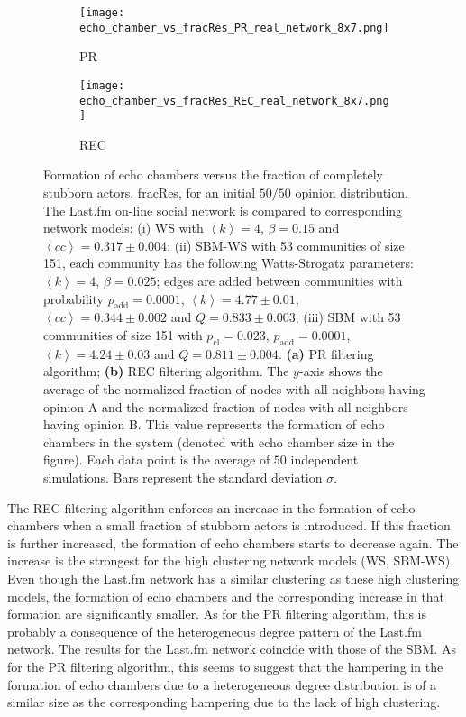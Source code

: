 \documentclass[11 pt , letterpaper , twoside , openright]{book}
\begin{document}
\begin{figure}[H]
  \begin{subfigure}[b]{0.49\textwidth}
    \caption{PR}
  	\texttt{[image: echo\_chamber\_vs\_fracRes\_PR\_real\_network\_8x7.png]}
    \label{pr_real}
  \end{subfigure}
  \begin{subfigure}[b]{0.49\textwidth}
    \caption{REC}
  	\texttt{[image: echo\_chamber\_vs\_fracRes\_REC\_real\_network\_8x7.png]}
    \label{rec_real}
  \end{subfigure}
  \captionsetup{format=plain}
  \caption[Formation of echo chambers versus fraction of completely stubborn actors for the PR and REC filtering algorithms and an initial $50/50$ opinion distribution. The Last.fm on-line social network is compared to corresponding network models.]{Formation of echo chambers versus the fraction of completely stubborn actors, fracRes, for an initial $50/50$ opinion distribution. The Last.fm on-line social network is compared to corresponding network models: (i) WS with $\left<k\right> = 4$, $\beta = 0.15$ and $\left<cc\right> = 0.317 \pm 0.004$; (ii) SBM-WS with 53 communities of size 151, each community has the following Watts-Strogatz parameters: $\left<k\right> = 4$, $\beta = 0.025$; edges are added between communities with probability $p_\text{add} = 0.0001$, $\left<k\right> = 4.77 \pm 0.01$, $\left<cc\right> = 0.344 \pm 0.002$ and $Q = 0.833 \pm 0.003$; (iii) SBM with 53 communities of size 151 with $p_\text{cl} = 0.023$, $p_\text{add} = 0.0001$, $\left<k\right> = 4.24 \pm 0.03$ and $Q = 0.811 \pm 0.004$. \textbf{(a)} PR filtering algorithm; \textbf{(b)} REC filtering algorithm. The $y$-axis shows the average of the normalized fraction of nodes with all neighbors having opinion A and the normalized fraction of nodes with all neighbors having opinion B. This value represents the formation of echo chambers in the system (denoted with echo chamber size in the figure). Each data point is the average of $50$ independent simulations. Bars represent the standard deviation $\sigma$.}
\label{echo_vs_fracRes_real}
\end{figure}
\noindent
The REC filtering algorithm enforces an increase in the formation of echo chambers when a small fraction of stubborn actors is introduced. If this fraction is further increased, the formation of echo chambers starts to decrease again. The increase is the strongest for the high clustering network models (WS, SBM-WS). Even though the Last.fm network has a similar clustering as these high clustering models, the formation of echo chambers and the corresponding increase in that formation are significantly smaller. As for the PR filtering algorithm, this is probably a consequence of the heterogeneous degree pattern of the Last.fm network. The results for the Last.fm network coincide with those of the SBM. As for the PR filtering algorithm, this seems to suggest that the hampering in the formation of echo chambers due to a heterogeneous degree distribution is of a similar size as the corresponding hampering due to the lack of high clustering. 
\end{document}
